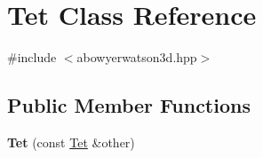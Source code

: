 \hypertarget{classTet}{\section{Tet Class Reference}
\label{classTet}
}


{\ttfamily \#include $<$abowyerwatson3d.\-hpp$>$}

\subsection*{Public Member Functions}
\begin{DoxyCompactItemize}
\item 
\hypertarget{classTet_a20c47f8ccfc16914447cf08815eedb39}{{\bfseries Tet} (const \hyperlink{classTet}{Tet} \&other)}\label{classTet_a20c47f8ccfc16914447cf08815eedb39}

\end{DoxyCompactItemize}
